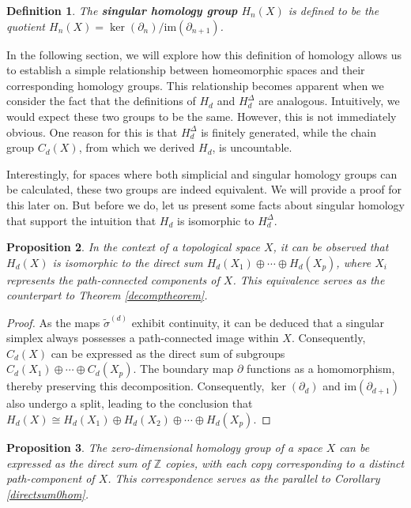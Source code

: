 \documentclass{amsart}
\newtheorem{definition}{Definition}[section]
\newtheorem{proposition}[definition]{Proposition}
\begin{document}
\begin{definition}
The \textbf{singular homology group} $H_n(X)$ is defined to be the quotient $H_n(X) = \ker(\partial_n) / \text{im}(\partial_{n+1})$.
\end{definition}

In the following section, we will explore how this definition of homology allows us to establish a simple relationship between homeomorphic spaces and their corresponding homology groups. This relationship becomes apparent when we consider the fact that the definitions of $H_d$ and $H^\Delta_d$ are analogous. Intuitively, we would expect these two groups to be the same. However, this is not immediately obvious. One reason for this is that $H^\Delta_d$ is finitely generated, while the chain group $C_d(X)$, from which we derived $H_d$, is uncountable.

Interestingly, for spaces where both simplicial and singular homology groups can be calculated, these two groups are indeed equivalent. We will provide a proof for this later on. But before we do, let us present some facts about singular homology that support the intuition that $H_d$ is isomorphic to $H^\Delta_d$.

\begin{proposition}
In the context of a topological space $X$, it can be observed that $H_d(X)$ is isomorphic to the direct sum $H_d(X_1) \oplus \cdots \oplus H_d(X_p)$, where $X_i$ represents the path-connected components of $X$. This equivalence serves as the counterpart to Theorem \ref{decomptheorem}.\end{proposition}

\begin{proof}
As the maps $\tilde{\sigma}^{(d)}$ exhibit continuity, it can be deduced that a singular simplex always possesses a path-connected image within $X$. Consequently, $C_d(X)$ can be expressed as the direct sum of subgroups $C_d(X_1) \oplus \cdots \oplus C_d(X_p)$. The boundary map $\partial$ functions as a homomorphism, thereby preserving this decomposition. Consequently, $\ker(\partial_d)$ and $\text{im}(\partial_{d+1})$ also undergo a split, leading to the conclusion that $H_d(X) \cong H_d(X_1) \oplus H_d(X_2) \oplus \cdots \oplus H_d(X_p)$.
\end{proof}


\begin{proposition}
The zero-dimensional homology group of a space $X$ can be expressed as the direct sum of $\mathbb{Z}$ copies, with each copy corresponding to a distinct path-component of $X$. This correspondence serves as the parallel to Corollary \ref{directsum0hom}.\end{proposition}
\end{document}
